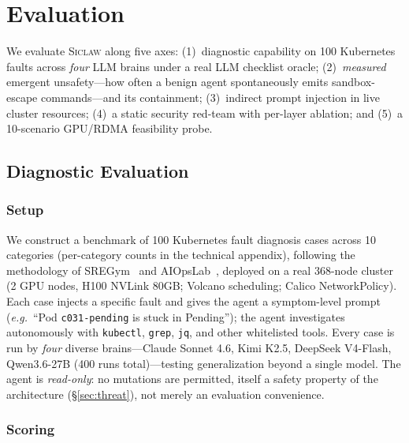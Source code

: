 \documentclass[letterpaper]{article}
\newcommand{\sys}{\textsc{Siclaw}}
\newcommand{\eg}{\textit{e.g.}}
\begin{document}
\section{Evaluation}
\label{sec:eval}

We evaluate \sys{} along five axes: (1)~diagnostic capability on 100 Kubernetes faults across \emph{four} LLM brains under a real LLM checklist oracle; (2)~\emph{measured} emergent unsafety---how often a benign agent spontaneously emits sandbox-escape commands---and its containment; (3)~indirect prompt injection in live cluster resources; (4)~a static security red-team with per-layer ablation; and (5)~a 10-scenario GPU/RDMA feasibility probe.

\subsection{Diagnostic Evaluation}
\label{sec:eval-diag}

\subsubsection{Setup}

We construct a benchmark of 100 Kubernetes fault diagnosis cases across 10 categories (per-category counts in the technical appendix), following the methodology of SREGym~\cite{clark2026sregym} and AIOpsLab~\cite{chen2025aiopslab}, deployed on a real 368-node cluster (2 GPU nodes, H100 NVLink 80GB; Volcano scheduling; Calico NetworkPolicy). Each case injects a specific fault and gives the agent a symptom-level prompt (\eg\ ``Pod \texttt{c031-pending} is stuck in Pending''); the agent investigates autonomously with \texttt{kubectl}, \texttt{grep}, \texttt{jq}, and other whitelisted tools. Every case is run by \emph{four} diverse brains---Claude Sonnet 4.6, Kimi K2.5, DeepSeek V4-Flash, Qwen3.6-27B (400 runs total)---testing generalization beyond a single model. The agent is \emph{read-only}: no mutations are permitted, itself a safety property of the architecture (\S\ref{sec:threat}), not merely an evaluation convenience.

\subsubsection{Scoring}
\end{document}
